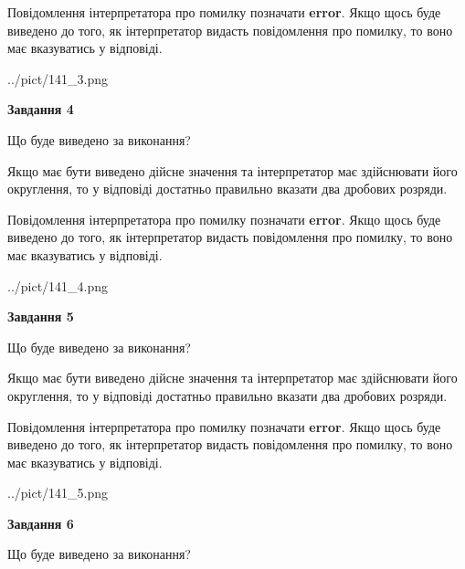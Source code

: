 \documentclass[12pt, ukrainian]{article}
\begin{document}
{\begin {Large}
Повідомлення інтерпретатора про помилку позначати \textbf{error}.
Якщо щось буде виведено до того, як інтерпретатор видасть повідомлення про помилку, 
то воно має вказуватись у відповіді. \par

\begin{center}
	{../pict/141_3.png}
\end{center}
\newpage

{\begin {center}\textbf{Завдання 4}\end {center}}\par
Що буде виведено за виконання? \par

Якщо має бути виведено дійсне значення та інтерпретатор має здійснювати його округлення, 
то у відповіді достатньо правильно вказати два дробових розряди.

Повідомлення інтерпретатора про помилку позначати \textbf{error}.
Якщо щось буде виведено до того, як інтерпретатор видасть повідомлення про помилку, 
то воно має вказуватись у відповіді. \par

\begin{center}
	{../pict/141_4.png}
\end{center}
\newpage

{\begin {center}\textbf{Завдання 5}\end {center}}\par
Що буде виведено за виконання? \par

Якщо має бути виведено дійсне значення та інтерпретатор має здійснювати його округлення, 
то у відповіді достатньо правильно вказати два дробових розряди.

Повідомлення інтерпретатора про помилку позначати \textbf{error}.
Якщо щось буде виведено до того, як інтерпретатор видасть повідомлення про помилку, 
то воно має вказуватись у відповіді. \par

\begin{center}
	{../pict/141_5.png}
\end{center}
\newpage

{\begin {center}\textbf{Завдання 6}\end {center}}\par
Що буде виведено за виконання? \par


\end{Large}}
\end{document}
